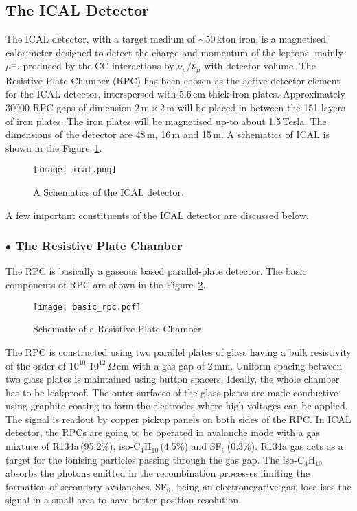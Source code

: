 \subsection{The ICAL Detector}
The ICAL detector, with a target medium of $\sim 50$\,kton iron, is a
magnetised calorimeter designed to detect the charge and momentum of
the leptons, mainly $\mu^{\pm}$, produced by the CC interactions by
$\nu_{\mu}/\bar{\nu}_{\mu}$ with detector volume. The Resistive Plate
Chamber (RPC) has been chosen as the active detector element for the
ICAL detector, interspersed with 5.6\,cm thick iron plates.
Approximately 30000 RPC gaps of dimension 2\,m\,$\times$\,2\,m will
be placed in between the 151 layers of iron plates. The iron plates
will be magnetised up-to about 1.5\,Tesla. The dimensions of the
detector are 48\,m, 16\,m and 15\,m. A schematics of ICAL is shown in
the Figure~\ref{fig:icalsk}. 
\begin{figure}[h]
  \centering
  \texttt{[image: ical.png]}
  \caption{A Schematics of the ICAL detector\cite{inoreport}.}
  \label{fig:icalsk}
\end{figure}
A few important constituents of the ICAL detector are discussed below.

\subsubsection*{$\bullet$ The Resistive Plate Chamber}
The RPC is basically a gaseous based parallel-plate
detector\cite{rpc_p2}. The basic components of RPC are shown in the
Figure~\ref{fig:rpc}. 
\begin{figure}[h]
  \centering
  \texttt{[image: basic\_rpc.pdf]}
  \caption{Schematic of a Resistive Plate Chamber.}
  \label{fig:rpc}
\end{figure}
The RPC is constructed using two parallel plates of glass having a
bulk resistivity of the order of $10^{10}$-$10^{12}$\,$\Omega$\,cm with
a gas gap of 2\,mm. Uniform spacing between two glass plates is
maintained using button spacers. Ideally, the whole chamber has to be
leakproof. The outer surfaces of the glass plates are made conductive
using graphite coating to form the electrodes where high voltages can
be applied. The signal is readout by copper pickup panels on both
sides of the RPC. In ICAL detector, the RPCs are going to be operated
in avalanche mode with a gas mixture of R134a\,(95.2\%),
iso-C$_4$H$_{10}$\,(4.5\%) and SF$_6$\,(0.3\%). R134a gas acts as a
target for the ionising particles passing through the gas gap. The
iso-C$_4$H$_{10}$ absorbs the photons emitted in the recombination
processes limiting the formation of secondary avalanches. SF$_6$,
being an electronegative gas, localises the signal in a small area to
have better position resolution.

